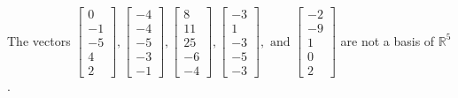 \begin{exercise}
\begin{exerciseStatement}
  \end{exerciseStatement}
  \begin{exerciseAnswer}
   The vectors \(\left[\begin{array}{r}
0 \\
-1 \\
-5 \\
4 \\
2
\end{array}\right] , \left[\begin{array}{r}
-4 \\
-4 \\
-5 \\
-3 \\
-1
\end{array}\right] , \left[\begin{array}{r}
8 \\
11 \\
25 \\
-6 \\
-4
\end{array}\right] , \left[\begin{array}{r}
-3 \\
1 \\
-3 \\
-5 \\
-3
\end{array}\right] , \text{ and } \left[\begin{array}{r}
-2 \\
-9 \\
1 \\
0 \\
2
\end{array}\right]\) 
  	 are not  a basis of \(\mathbb{R}^5\).
  


  \end{exerciseAnswer}
\end{exercise}